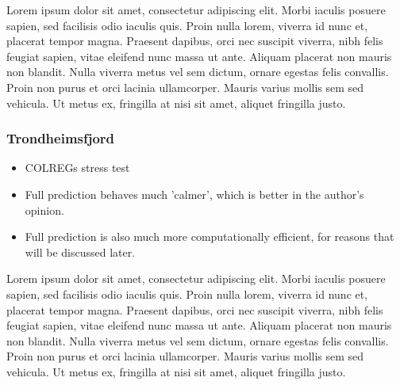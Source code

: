Lorem ipsum dolor sit amet, consectetur adipiscing elit. Morbi iaculis posuere sapien, sed facilisis odio iaculis quis. 
Proin nulla lorem, viverra id nunc et, placerat tempor magna. Praesent dapibus, orci nec suscipit viverra, nibh felis feugiat sapien, 
vitae eleifend nunc massa ut ante. Aliquam placerat non mauris non blandit. Nulla viverra metus vel sem dictum, ornare egestas felis convallis. 
Proin non purus et orci lacinia ullamcorper. Mauris varius mollis sem sed vehicula. Ut metus ex, fringilla at nisi sit amet, aliquet fringilla justo.



\subsubsection{Trondheimsfjord}
\begin{itemize}
    \item COLREGs stress test
    \item Full prediction behaves much 'calmer', which is better in the author's opinion.
    \item Full prediction is also much more computationally efficient, for reasons that will be discussed later.
\end{itemize}
Lorem ipsum dolor sit amet, consectetur adipiscing elit. Morbi iaculis posuere sapien, sed facilisis odio iaculis quis. 
Proin nulla lorem, viverra id nunc et, placerat tempor magna. Praesent dapibus, orci nec suscipit viverra, nibh felis feugiat sapien, 
vitae eleifend nunc massa ut ante. Aliquam placerat non mauris non blandit. Nulla viverra metus vel sem dictum, ornare egestas felis convallis. 
Proin non purus et orci lacinia ullamcorper. Mauris varius mollis sem sed vehicula. Ut metus ex, fringilla at nisi sit amet, aliquet fringilla justo.



